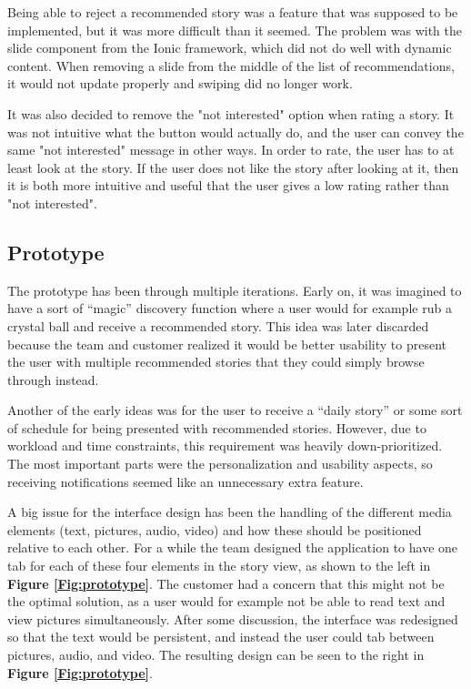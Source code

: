 Being able to reject a recommended story was a feature that was supposed to be implemented, but it was more difficult than it seemed. The problem was with the slide component from the Ionic framework, which did not do well with dynamic content. When removing a slide from the middle of the list of recommendations, it would not update properly and swiping did no longer work. \newline

It was also decided to remove the "not interested" option when rating a story. It was not intuitive what the button would actually do, and the user can convey the same "not interested" message in other ways. In order to rate, the user has to at least look at the story. If the user does not like the story after looking at it, then it is both more intuitive and useful that the user gives a low rating rather than "not interested". 

\subsection{Prototype}

The prototype has been through multiple iterations. Early on, it was imagined to have a sort of “magic” discovery function where a user would for example rub a crystal ball and receive a recommended story. This idea was later discarded because the team and customer realized
 it would be better usability to present the user with multiple recommended stories that they could simply browse through instead.\newline

Another of the early ideas was for the user to receive a “daily story” or some sort of schedule for being presented with recommended stories. However, due to workload and time constraints, this requirement was heavily down-prioritized. The most important parts were the personalization and usability aspects, so receiving notifications seemed like an unnecessary extra feature.\newline

A big issue for the interface design has been the handling of the different media elements (text, pictures, audio, video) and how these should be positioned relative to each other. For a while the team designed the application to have one tab for each of these four elements in the story view, as shown to the left in \textbf{Figure \ref{Fig:prototype}}. The customer had a concern that this might not be the optimal solution, as a user would for example not be able to read text and view pictures simultaneously. After some discussion, the interface was redesigned so that the text would be persistent, and instead the user could tab between pictures, audio, and video. The resulting design can be seen to the right in \textbf{Figure \ref{Fig:prototype}}. \newline

